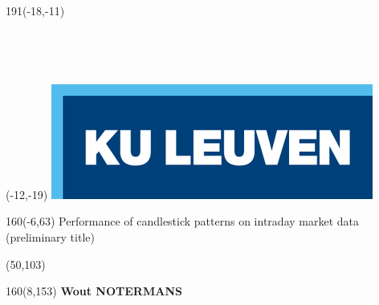 \thispagestyle{empty}
\newcommand{\form}[1]{\scalebox{1.087}{\boldmath{#1}}}
\sffamily
%
\begin{textblock}{191}(-18,-11)
\colorbox{bluetitle}{\hspace{139mm}\ \parbox[c][18truemm]{52mm}{\textcolor{white}{FACULTY OF SCIENCE}}}
\end{textblock}
%
\begin{textblock}{70}(-12,-19)
\textblockcolour{}
\includegraphics*[height=19.8truemm]{Images/LogoKULeuven}
\end{textblock}
%
\begin{textblock}{160}(-6,63)
\textblockcolour{}
\vspace{-\parskip}
\flushleft
\fontsize{40}{42}\selectfont \textcolor{bluetitle}{Performance of candlestick patterns on intraday market data}\\[1.5mm]
\fontsize{20}{22}\selectfont (preliminary title)
\end{textblock}
%
\begin{textblock}{82}(50,103)
\textblockcolour{}
\vspace{-\parskip}
\flushleft
\end{textblock}
%
\begin{textblock}{160}(8,153)
\textblockcolour{}
\vspace{-\parskip}
\flushright
\fontsize{14}{16}\selectfont \textbf{Wout NOTERMANS}
\end{textblock}
